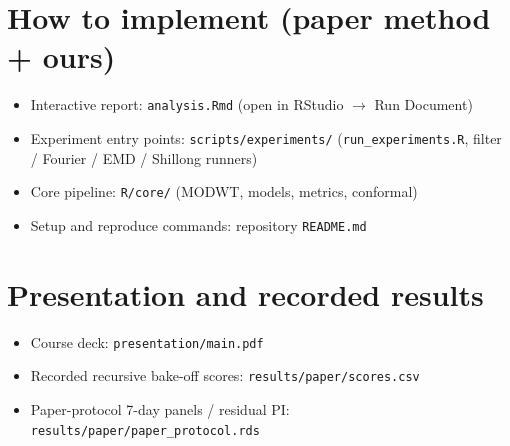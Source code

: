 \documentclass[11pt,a4paper]{article}
\begin{document}
\section*{How to implement (paper method + ours)}
\begin{itemize}[leftmargin=1.2em,itemsep=0.25em]
  \item Interactive report: \texttt{analysis.Rmd} (open in RStudio $\rightarrow$ Run Document)
  \item Experiment entry points: \texttt{scripts/experiments/}
        (\texttt{run\_experiments.R}, filter / Fourier / EMD / Shillong runners)
  \item Core pipeline: \texttt{R/core/} (MODWT, models, metrics, conformal)
  \item Setup and reproduce commands: repository \texttt{README.md}
\end{itemize}

\section*{Presentation and recorded results}
\begin{itemize}[leftmargin=1.2em,itemsep=0.25em]
  \item Course deck: \texttt{presentation/main.pdf}
  \item Recorded recursive bake-off scores: \texttt{results/paper/scores.csv}
  \item Paper-protocol 7-day panels / residual PI: \texttt{results/paper/paper\_protocol.rds}
\end{itemize}

\vspace{0.5em}
\end{document}
